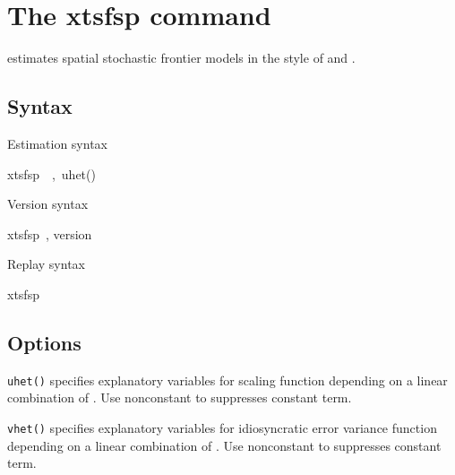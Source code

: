 
\section{The xtsfsp command}
\vspace{5pt}
 estimates spatial stochastic frontier models in the style of \cite{orea2019new} and \cite{galli2022spatial}.

\subsection{Syntax}
\vspace{5pt}
Estimation syntax

\begin{stsyntax}
	xtsfsp\
    \depvar\
    \optindepvars,\
    uhet(\varlist {})		
\end{stsyntax}



\noindent Version syntax

\begin{stsyntax}
	xtsfsp\
	, version
\end{stsyntax}


\noindent Replay syntax

\begin{stsyntax}
	xtsfsp\
\end{stsyntax}

\subsection{Options}
\vspace{5pt}
\hangpara
{\tt uhet(\varlist [,noconstant])} specifies explanatory variables for scaling  function depending on a linear combination of \varlist. Use nonconstant to suppresses constant term.

\hangpara
{\tt vhet(\varlist [,noconstant])} specifies explanatory variables for idiosyncratic error variance function depending on a linear combination of \varlist. Use nonconstant to suppresses constant term.

